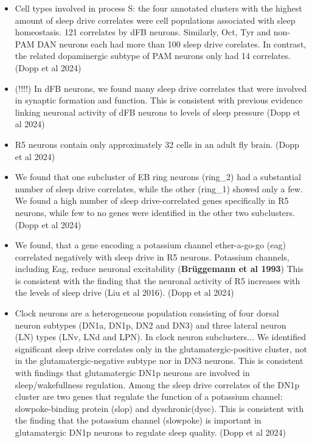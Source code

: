 \documentclass[11pt]{article}
\begin{document}
\begin{itemize}
    \item Cell types involved in process S: the four annotated clusters with the highest amount of sleep drive correlates
    were cell populations associated with sleep homeostasis. 121 correlates by dFB neurons. Similarly, Oct, Tyr and non-PAM DAN
    neurons each had more than 100 sleep drive corelates. In contrast, the related dopaminergic subtype of PAM neurons only had
    14 correlates.
    (Dopp et al 2024)

    \item (!!!!) In dFB neurons, we found many sleep drive correlates that were involved in synaptic formation and function. This is
    consistent with previous evidence linking neuronal activity of dFB neurons to levels of sleep pressure
    (Dopp et al 2024)

    \item R5 neurons contain only approximately 32 cells in an adult fly brain.
    (Dopp et al 2024)

    \item We found that one subcluster of EB ring neurons (ring\_2) had a substantial number of sleep drive correlates, while the
    other (ring\_1) showed only a few. We found a high number of sleep drive-correlated genes specifically in R5 neurons,
    while few to no genes were identified in the other two subclusters.
    (Dopp et al 2024)

    \item We found, that a gene encoding a potassium channel ether-a-go-go (eag) correlated negatively with sleep drive in R5 neurons.
    Potassium channels, including Eag, reduce neuronal excitability (\textbf{Brüggemann et al 1993})
    This is consistent with the finding that the neuronal activity of R5 increases with the levels of sleep drive
    (Liu et al 2016).
    (Dopp et al 2024)

    \item Clock neurons are a heterogeneous population consisting of four dorsal neuron subtypes (DN1a, DN1p, DN2 and DN3)
    and three lateral neuron (LN) types (LNv, LNd and LPN).
    In clock neuron subclusters... We identified significant sleep drive correlates only in the glutamatergic-positive
    cluster, not in the glutamatergic-negative subtype nor in DN3 neurons. This is consistent with findings that
    glutamatergic DN1p neurons are involved in sleep/wakefullness regulation. Among the sleep drive correlates of the DN1p cluster are
    two genes that regulate the function of a potassium channel: slowpoke-binding protein (slop) and dyschronic(dysc).
    This is consistent with the finding that the potassium channel (slowpoke) is important in glutamatergic DN1p neurons to regulate
    sleep quality.
    (Dopp et al 2024)


\end{itemize}
\end{document}
